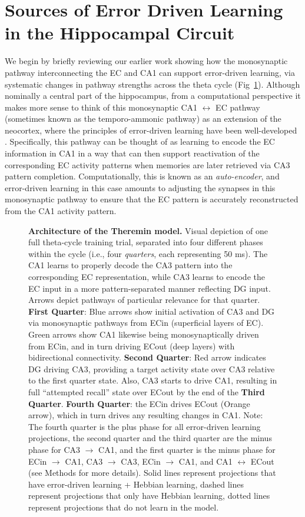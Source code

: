 \documentclass[10pt,letterpaper]{article}
\begin{document}
\section*{Sources of Error Driven Learning in the Hippocampal Circuit}

We begin by briefly reviewing our earlier work showing how the monosynaptic pathway interconnecting the EC and CA1 can support error-driven learning, via systematic changes in pathway strengths across the theta cycle \cite{KetzMorkondaOReilly13,HasselmoBodelonWyble02,SiegleWilson14} (Fig~\ref{fig1}).  Although nominally a central part of the hippocampus, from a computational perspective it makes more sense to think of this monosynaptic CA1 $\leftrightarrow$ EC pathway (sometimes known as the temporo-ammonic pathway) as an extension of the neocortex, where the principles of error-driven learning have been well-developed \cite{OReilly96,WhittingtonBogacz19,LillicrapSantoroMarrisEtAl20}.  Specifically, this pathway can be thought of as learning to encode the EC information in CA1 in a way that can then support reactivation of the corresponding EC activity patterns when memories are later retrieved via CA3 pattern completion.  Computationally, this is known as an \emph{auto-encoder}, and error-driven learning in this case amounts to adjusting the synapses in this monosynaptic pathway to ensure that the EC pattern is accurately reconstructed from the CA1 activity pattern.


\begin{figure}[!h]
  \caption{{\bf Architecture of the Theremin model.}
  Visual depiction of one full theta-cycle training trial, separated into four different phases within the cycle (i.e., four \emph{quarters}, each representing 50 ms).  The CA1 learns to properly decode the CA3 pattern into the corresponding EC representation, while CA3 learns to encode the EC input in a more pattern-separated manner reflecting DG input.  Arrows depict pathways of particular relevance for that quarter.  \textbf{First Quarter}: Blue arrows show initial activation of CA3 and DG via monosynaptic pathways from ECin (superficial layers of EC).  Green arrows show CA1 likewise being monosynaptically driven from ECin, and in turn driving ECout (deep layers) with bidirectional connectivity.  \textbf{Second Quarter}: Red arrow indicates DG driving CA3, providing a target activity state over CA3 relative to the first quarter state.  Also, CA3 starts to drive CA1, resulting in full ``attempted recall'' state over ECout by the end of the \textbf{Third Quarter}.  \textbf{Fourth Quarter}: the ECin drives ECout (Orange arrow), which in turn drives any resulting changes in CA1.  Note: The fourth quarter is the plus phase for all error-driven learning projections, the second quarter and the third quarter are the minus phase for CA3 $\rightarrow$ CA1, and the first quarter is the minus phase for ECin $\rightarrow$ CA1, CA3 $\rightarrow$ CA3, ECin $\rightarrow$ CA1, and CA1 $\leftrightarrow$ ECout (see Methods for more details).  Solid lines represent projections that have error-driven learning + Hebbian learning, dashed lines represent projections that only have Hebbian learning, dotted lines represent projections that do not learn in the model. }
\label{fig1}
\end{figure}
\end{document}
